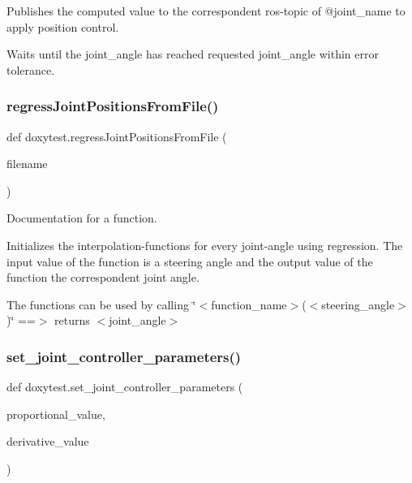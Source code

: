 Publishes the computed value to the correspondent ros-\/topic of @joint\+\_\+name to apply position control.

Waits until the joint\+\_\+angle has reached requested joint\+\_\+angle within error tolerance. \mbox{\label{namespacedoxytest_a86deb2d59740da764c4bf05ff28ec458}} 
\subsubsection{\texorpdfstring{regressJointPositionsFromFile()}{regressJointPositionsFromFile()}}
{\footnotesize\ttfamily def doxytest.\+regress\+Joint\+Positions\+From\+File (\begin{DoxyParamCaption}\item[{}]{filename }\end{DoxyParamCaption})}



Documentation for a function. 

Initializes the interpolation-\/functions for every joint-\/angle using regression. The input value of the function is a steering angle and the output value of the function the correspondent joint angle.

The functions can be used by calling \char`\"{}$<$function\+\_\+name$>$($<$steering\+\_\+angle$>$)\char`\"{} ==$>$ returns $<$joint\+\_\+angle$>$ \mbox{\label{namespacedoxytest_a3df04af9cb765f57157e4d9c6b892be4}} 
\subsubsection{\texorpdfstring{set\_joint\_controller\_parameters()}{set\_joint\_controller\_parameters()}}
{\footnotesize\ttfamily def doxytest.\+set\+\_\+joint\+\_\+controller\+\_\+parameters (\begin{DoxyParamCaption}\item[{}]{proportional\+\_\+value,  }\item[{}]{derivative\+\_\+value }\end{DoxyParamCaption})}



